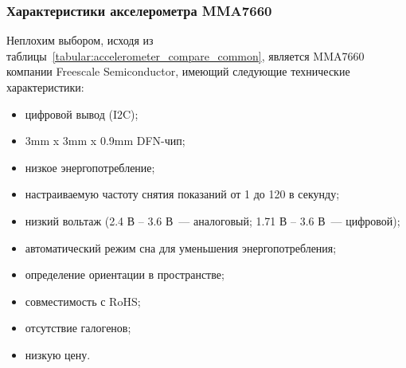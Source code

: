 \documentclass[document.tex]{subfiles}
\begin{document}
\begin{table}[h]
\medskip
{}
\medskip
\caption{Общие характеристики цифровых акселерометров}
\label{tabular:accelerometer_compare_common}
\end{table}

\clearpage
\subsubsection{Характеристики акселерометра MMA7660}
Неплохим выбором, исходя из таблицы~\ref{tabular:accelerometer_compare_common}, является MMA7660 компании Freescale Semiconductor, имеющий следующие технические характеристики:
\begin{itemize}
	\item цифровой вывод (I2C);
	\item 3mm x 3mm x 0.9mm DFN-чип; 
	\item низкое энергопотребление;
	\item настраиваемую частоту снятия показаний от 1 до 120 в секунду;
	\item низкий вольтаж (2.4 В -- 3.6 В~--- аналоговый; 1.71 В -- 3.6 В~--- цифровой);
	\item автоматический режим сна для уменьшения энергопотребления;
	\item определение ориентации в пространстве;
	\item совместимость с RoHS;
	\item отсутствие галогенов;
	\item низкую цену.
\end{itemize}
\end{document}
